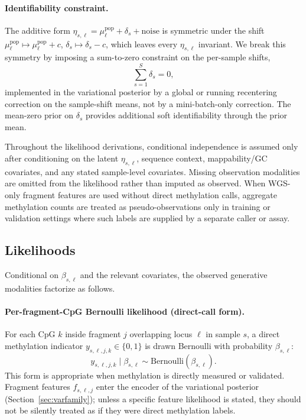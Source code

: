 \paragraph{Identifiability constraint.} The additive form $\eta_{s,\ell}=\mu^{\mathrm{pop}}_\ell+\delta_s+\mathrm{noise}$ is symmetric under the shift $\mu^{\mathrm{pop}}_\ell\mapsto\mu^{\mathrm{pop}}_\ell+c$, $\delta_s\mapsto\delta_s-c$, which leaves every $\eta_{s,\ell}$ invariant. We break this symmetry by imposing a sum-to-zero constraint on the per-sample shifts,
\begin{equation}
\sum_{s=1}^{S}\delta_s=0,
\label{eq:sumzero}
\end{equation}
implemented in the variational posterior by a global or running recentering correction on the sample-shift means, not by a mini-batch-only correction. The mean-zero prior on $\delta_s$ provides additional soft identifiability through the prior mean.

\begin{assumption}
\label{ass:obs}
Throughout the likelihood derivations, conditional independence is assumed only after conditioning on the latent $\eta_{s,\ell}$, sequence context, mappability/GC covariates, and any stated sample-level covariates. Missing observation modalities are omitted from the likelihood rather than imputed as observed. When WGS-only fragment features are used without direct methylation calls, aggregate methylation counts are treated as pseudo-observations only in training or validation settings where such labels are supplied by a separate caller or assay.
\end{assumption}

\subsection{Likelihoods}
Conditional on $\beta_{s,\ell}$ and the relevant covariates, the observed generative modalities factorize as follows.

\paragraph{Per-fragment-CpG Bernoulli likelihood (direct-call form).} For each CpG $k$ inside fragment $j$ overlapping locus $\ell$ in sample $s$, a direct methylation indicator $y_{s,\ell,j,k}\in\{0,1\}$ is drawn Bernoulli with probability $\beta_{s,\ell}$:
\begin{equation}
y_{s,\ell,j,k}\mid \beta_{s,\ell}\sim \mathrm{Bernoulli}(\beta_{s,\ell}).
\label{eq:bern}
\end{equation}
This form is appropriate when methylation is directly measured or validated. Fragment features $f_{s,\ell,j}$ enter the encoder of the variational posterior (Section~\ref{sec:varfamily}); unless a specific feature likelihood is stated, they should not be silently treated as if they were direct methylation labels.

